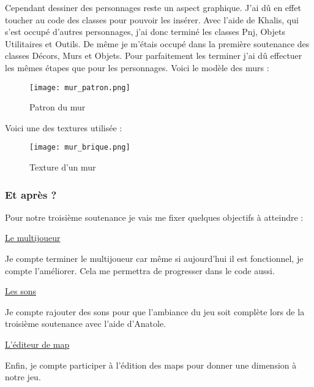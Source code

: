 \documentclass{article}
\begin{document}
\newpage

\par
Cependant dessiner des personnages reste un aspect graphique. J’ai dû en effet toucher au code des classes pour pouvoir les insérer. Avec l’aide de Khalis, qui s’est occupé d’autres personnages, j’ai donc terminé les classes Pnj, Objets Utilitaires et Outils.
De même je m’étais occupé dans la première soutenance des classes Décors, Murs et Objets. Pour parfaitement les terminer j’ai dû effectuer les mêmes étapes que pour les personnages.
\newpage
Voici le modèle des murs :
\begin{figure}[h]
\begin{center}
\texttt{[image: mur\_patron.png]}
\caption{Patron du mur}
\end{center}
\end{figure}

Voici une des textures utilisée :
\begin{figure}[h]
\begin{center}
\texttt{[image: mur\_brique.png]}
\caption{Texture d'un mur}
\end{center}
\end{figure}

\newpage
\subsubsection{Et après ?}
\par
Pour notre troisième soutenance je vais me fixer quelques objectifs à atteindre :
\newline

\par
\underline{Le multijoueur}
\newline
\par
Je compte terminer le multijoueur car même si aujourd'hui il est fonctionnel, je compte l'améliorer. Cela me permettra de progresser dans le code aussi.
\newline

\par
\underline{Les sons}
\newline
\par
Je compte rajouter des sons pour que l'ambiance du jeu soit complète lors de la troisième soutenance avec l’aide d’Anatole.
\newline

\par
\underline{L'éditeur de map}
\newline
\par
Enfin, je compte participer à l'édition des maps pour donner une dimension à notre jeu.
\newline
\end{document}
